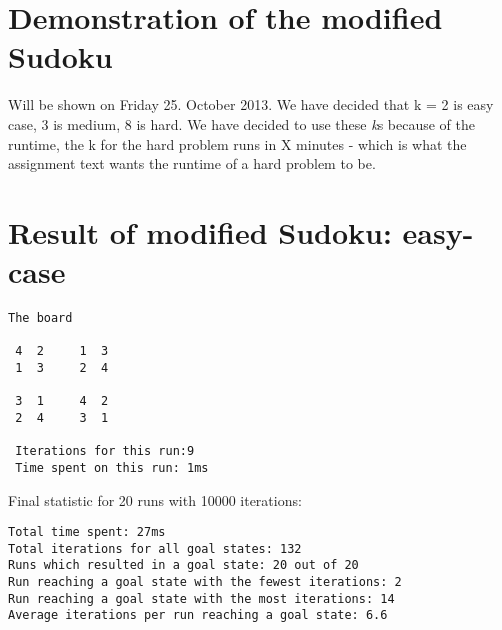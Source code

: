 \documentclass[12pt, a4paper]{article}
\begin{document}
\section{Demonstration of the modified Sudoku}
Will be shown on Friday 25. October 2013.
We have decided that k = 2 is easy case, 3 is medium, 8 is hard. 
We have decided to use these \textit{k}s because of the runtime, the k for the hard problem runs in X minutes - which is what the assignment text wants the runtime of a hard problem to be.

\section{Result of modified Sudoku: easy-case}
\begin{verbatim}
The board

 4  2     1  3 
 1  3     2  4 

 3  1     4  2 
 2  4     3  1 
 
 Iterations for this run:9
 Time spent on this run: 1ms
\end{verbatim}
Final statistic for 20 runs with 10000 iterations:
\begin{verbatim}
Total time spent: 27ms
Total iterations for all goal states: 132
Runs which resulted in a goal state: 20 out of 20
Run reaching a goal state with the fewest iterations: 2
Run reaching a goal state with the most iterations: 14
Average iterations per run reaching a goal state: 6.6

\end{verbatim}
\end{document}
